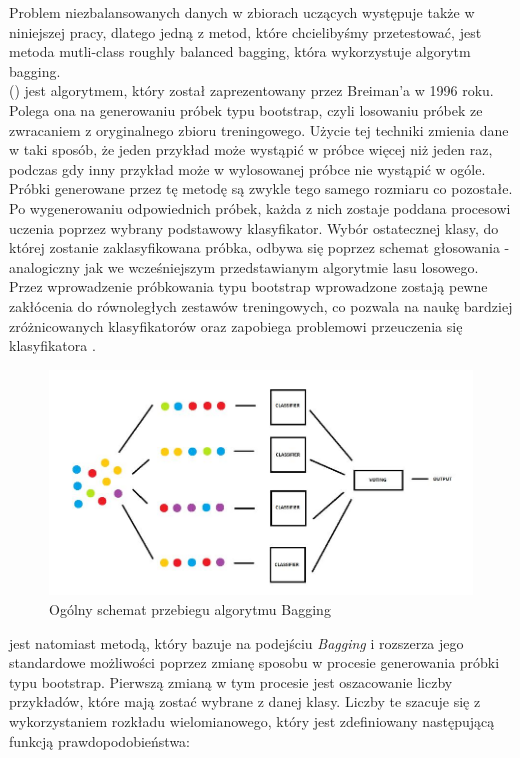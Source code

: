 Problem niezbalansowanych danych w zbiorach uczących występuje także w niniejszej pracy, dlatego jedną z metod, które chcielibyśmy przetestować, jest metoda mutli-class roughly balanced bagging, która wykorzystuje algorytm bagging.\\

 () jest algorytmem, który został zaprezentowany przez Breiman'a w 1996 roku. Polega ona na generowaniu próbek typu bootstrap, czyli losowaniu próbek ze zwracaniem z oryginalnego zbioru treningowego. Użycie tej techniki zmienia dane w taki sposób, że jeden przykład może wystąpić w próbce więcej niż jeden raz, podczas gdy inny przykład może w wylosowanej próbce nie wystąpić w ogóle. Próbki generowane przez tę metodę są zwykle tego samego rozmiaru co pozostałe. Po wygenerowaniu odpowiednich próbek, każda z nich zostaje poddana procesowi uczenia poprzez wybrany podstawowy klasyfikator. Wybór ostatecznej klasy, do której zostanie zaklasyfikowana próbka, odbywa się poprzez schemat głosowania - analogiczny jak we wcześniejszym przedstawianym algorytmie lasu losowego. Przez wprowadzenie próbkowania typu bootstrap wprowadzone zostają pewne zakłócenia do równoległych zestawów treningowych, co pozwala na naukę bardziej zróżnicowanych klasyfikatorów oraz zapobiega problemowi przeuczenia się klasyfikatora \cite{MRBag}.

\begin{figure}[h] 
        \centering\includegraphics[width=16cm]{figures/bagging.JPG}
        \caption{Ogólny schemat przebiegu algorytmu Bagging \cite{MultiImbalance2020}}
\end{figure}

 jest natomiast metodą, który bazuje na podejściu \textit{Bagging} i rozszerza jego standardowe możliwości poprzez zmianę sposobu w procesie generowania próbki typu bootstrap. Pierwszą zmianą w tym procesie jest oszacowanie liczby przykładów, które mają zostać wybrane z danej klasy. Liczby te szacuje się z wykorzystaniem rozkładu wielomianowego, który jest zdefiniowany następującą funkcją prawdopodobieństwa:

